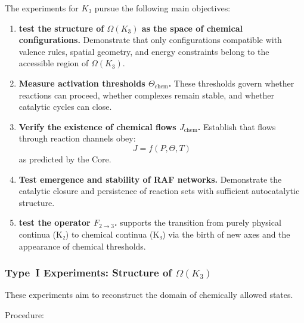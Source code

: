 The experiments for $K_3$ pursue the following main objectives:

\begin{enumerate}
    \item \textbf{test the structure of $\Omega(K_3)$ as the space of
          chemical configurations.}
          Demonstrate that only configurations compatible with valence rules,
          spatial geometry, and energy constraints belong to the accessible
          region of $\Omega(K_3)$.

    \item \textbf{Measure activation thresholds $\Theta_{\mathrm{chem}}$.}
          These thresholds govern whether reactions can proceed, whether
          complexes remain stable, and whether catalytic cycles can close.

    \item \textbf{Verify the existence of chemical flows $J_{\mathrm{chem}}$.}
          Establish that flows through reaction channels obey:
          \[
              J = f(P, \Theta, T)
          \]
          as predicted by the Core.

    \item \textbf{Test emergence and stability of RAF networks.}
          Demonstrate the catalytic closure and persistence of reaction sets
          with sufficient autocatalytic structure.

    \item \textbf{test the operator $F_{2 \rightarrow 3}$.}
          supports the transition from purely physical continua (K₂) to chemical
          continua (K₃) via the birth of new axes and the appearance of
          chemical thresholds.
\end{enumerate}



\subsubsection{Type~I Experiments: Structure of \texorpdfstring{$\Omega(K_3)$}{\Omega(K_3)}}

These experiments aim to reconstruct the domain of chemically allowed states.

Procedure:

